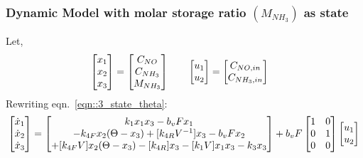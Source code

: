 \subsubsection{Dynamic Model with molar storage ratio $(M_{NH_3})$ as state}
Let,
\begin{align*}
    \begin{bmatrix} x_1 \\ x_2 \\ x_3 \end{bmatrix} = \begin{bmatrix} C_{NO} \\ C_{NH_3} \\ M_{NH_3} \end{bmatrix} \qquad &
    \begin{bmatrix} u_1 \\ u_2  \end{bmatrix} = \begin{bmatrix} C_{NO, in} \\ C_{NH_3, in} \end{bmatrix}
\end{align*}
Rewriting eqn.~\ref{eqn::3_state_theta}:
\begin{equation}\label{eqn::3_state_M}
    \begin{bmatrix} \dot x_1 \\ \dot x_2 \\ \dot x_3 \end{bmatrix} =
    \begin{bmatrix} k_1 x_1 x_3 - b_v F x_1 \\
        -k_{4F}  x_2 (\Theta-x_3) + [k_{4R} V^{-1}] x_3 - b_vF x_2 \\
        +[k_{4F}V] x_2 (\Theta-x_3) - [k_{4R}] x_3 - [k_1V] x_1 x_3 - k_3 x_3 \end{bmatrix} +
    b_v F \begin{bmatrix} 1 & 0 \\ 0 & 1 \\ 0 & 0 \end{bmatrix} \begin{bmatrix} u_1 \\ u_2 \end{bmatrix}\\
\end{equation}

